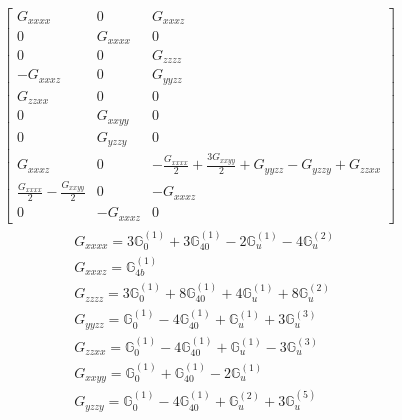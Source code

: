 \documentclass[fleqn,8pt,landscape]{jsarticle}
\begin{document}
\begin{align*}
\begin{bmatrix} G_{xxxx} & 0 & G_{xxxz} \\ 0 & G_{xxxx} & 0 \\ 0 & 0 & G_{zzzz} \\ - G_{xxxz} & 0 & G_{yyzz} \\ G_{zzxx} & 0 & 0 \\ 0 & G_{xxyy} & 0 \\ 0 & G_{yzzy} & 0 \\ G_{xxxz} & 0 & - \frac{G_{xxxx}}{2} + \frac{3 G_{xxyy}}{2} + G_{yyzz} - G_{yzzy} + G_{zzxx} \\ \frac{G_{xxxx}}{2} - \frac{G_{xxyy}}{2} & 0 & - G_{xxxz} \\ 0 & - G_{xxxz} & 0 \end{bmatrix}
\end{align*}
\begin{align*}
& G_{xxxx} = 3 \mathbb{G}_{0}^{(1)} + 3 \mathbb{G}_{40}^{(1)} - 2 \mathbb{G}_{u}^{(1)} - 4 \mathbb{G}_{u}^{(2)} \\
& G_{xxxz} = \mathbb{G}_{4b}^{(1)} \\
& G_{zzzz} = 3 \mathbb{G}_{0}^{(1)} + 8 \mathbb{G}_{40}^{(1)} + 4 \mathbb{G}_{u}^{(1)} + 8 \mathbb{G}_{u}^{(2)} \\
& G_{yyzz} = \mathbb{G}_{0}^{(1)} - 4 \mathbb{G}_{40}^{(1)} + \mathbb{G}_{u}^{(1)} + 3 \mathbb{G}_{u}^{(3)} \\
& G_{zzxx} = \mathbb{G}_{0}^{(1)} - 4 \mathbb{G}_{40}^{(1)} + \mathbb{G}_{u}^{(1)} - 3 \mathbb{G}_{u}^{(3)} \\
& G_{xxyy} = \mathbb{G}_{0}^{(1)} + \mathbb{G}_{40}^{(1)} - 2 \mathbb{G}_{u}^{(1)} \\
& G_{yzzy} = \mathbb{G}_{0}^{(1)} - 4 \mathbb{G}_{40}^{(1)} + \mathbb{G}_{u}^{(2)} + 3 \mathbb{G}_{u}^{(5)}
\end{align*}
\end{document}
